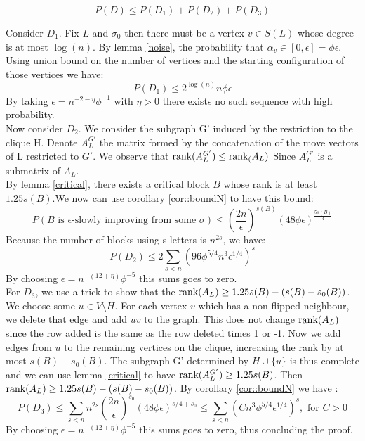 \begin{equation*}
P(D) \leq P(D_1) + P(D_2) + P(D_3)
\end{equation*}

Consider $D_1$. Fix $L$ and $\sigma_0$ then there must be a vertex $v \in S(L)$ whose degree is at most $\log(n)$. By lemma  \ref{noise}, the probability that $\alpha_v \in [0, \epsilon] = \phi \epsilon$. Using union bound on the number of vertices and the starting configuration of those vertices we have:
\begin{equation}
P(D_1)  \leq 2^{\log(n)}n \phi \epsilon
\end{equation}
By taking $\epsilon = n^{-2 - \eta} \phi^{-1}$ with $\eta > 0$ there exists no such sequence with high probability. \\

Now consider $D_2$. We consider the subgraph G' induced by the restriction to the clique H. Denote $A_L^{G'}$ the matrix formed by the concatenation of the move vectors of L restricted to $G'$. We observe that $\text{rank}(A_L^{G'}) \leq \text{rank}_(A_L)$ Since $A_L^{G'}$ is a submatrix of $A_L$.\\ 
By lemma \ref{critical}, there exists a critical block $B$ whose rank is at least $1.25 s(B)$.We now can use corollary \ref{cor::boundN} to have this bound:
\begin{equation*}
P(B \text{ is }\epsilon \text {-slowly improving from some }\sigma) \leq \left(\frac{2n}{\epsilon}\right)^{s(B)}(48\phi\epsilon)^{\frac{5s(B)}{4}}
\end{equation*}
Because the number of blocks using s letters is $n^{2s}$, we have:
\begin{equation*}
P(D_2) \leq 2 \sum_{s < n}(96\phi^{5/4}n^3\epsilon^{1/4})^s
\end{equation*}
By choosing $\epsilon = n^{-(12 + \eta)}\phi^{-5}$ this sums goes to zero.\\

For $D_3$, we use a trick to show that the $\text{rank}(A_L) \geq 1.25s(B) - (s(B) - s_0(B))$. We choose some $u \in V \setminus H$. For each vertex $v$ which has a non-flipped neighbour, we delete that edge and add $uv$ to the graph. This does not change $\text{rank}(A_L)$ since the row added is the same as the row deleted times 1 or -1. Now we add edges from $u$ to the remaining vertices on the clique, increasing the rank by at most $s(B) - s_0(B)$. The subgraph G' determined by $H \cup \{u\}$ is thus complete and we can use  lemma \ref{critical} to have $\text{rank}(A_L^{G'}) \geq 1.25 s(B)$. Then $\text{rank}(A_L) \geq 1.25s(B) - (s(B) - s_0(B))$.
By corollary \ref{cor::boundN} we have :
\begin{equation*}
P(D_3) \leq  \sum_{s < n}n^{2s}\left(\dfrac{2n}{\epsilon}\right)^{s_0}(48\phi\epsilon)^{s/4 + s_0} \leq \sum_{s < n}(Cn^{3}\phi^{5/4}\epsilon^{1/4})^{s}, \text{ for }C>0
\end{equation*}
By choosing $\epsilon = n^{-(12 + \eta)}\phi^{-5}$ this sums goes to zero, thus concluding the proof.